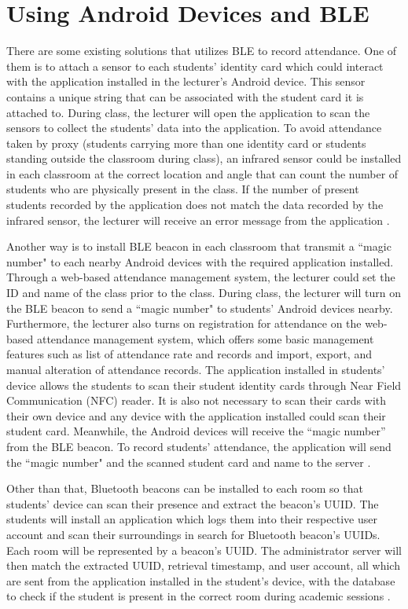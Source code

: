 \documentclass[../report.tex]{subfiles}
\begin{document}
\section{Using Android Devices and BLE}
There are some existing solutions that utilizes BLE to record attendance. One of them is to attach a sensor to each students’ identity card which could interact with the application installed in the lecturer’s Android device. This sensor contains a unique string that can be associated with the student card it is attached to. During class, the lecturer will open the application to scan the sensors to collect the students’ data into the application. To avoid attendance taken by proxy (students carrying more than one identity card or students standing outside the classroom during class), an infrared sensor could be installed in each classroom at the correct location and angle that can count the number of students who are physically present in the class. If the number of present students recorded by the application does not match the data recorded by the infrared sensor, the lecturer will receive an error message from the application \cite{7848166}.

Another way is to install BLE beacon in each classroom that transmit a ``magic number" to each nearby Android devices with the required application installed. Through a web-based attendance management system, the lecturer could set the ID and name of the class prior to the class. During class, the lecturer will turn on the BLE beacon to send a ``magic number" to students’ Android devices nearby. Furthermore, the lecturer also turns on registration for attendance on the web-based attendance management system, which offers some basic management features such as list of attendance rate and records and import, export, and manual alteration of attendance records. The application installed in students’ device allows the students to scan their student identity cards through Near Field Communication (NFC) reader. It is also not necessary to scan their cards with their own device and any device with the application installed could scan their student card. Meanwhile, the Android devices will receive the “magic number” from the BLE beacon. To record students’ attendance, the application will send the ``magic number" and the scanned student card and name to the server \cite{7350708}.

Other than that, Bluetooth beacons can be installed to each room so that students’ device can scan their presence and extract the beacon’s UUID. The students will install an application which logs them into their respective user account and scan their surroundings in search for Bluetooth beacon’s UUIDs. Each room will be represented by a beacon’s UUID. The administrator server will then match the extracted UUID, retrieval timestamp, and user account, all which are sent from the application installed in the student’s device, with the database to check if the student is present in the correct room during academic sessions \cite{20200029173}.
\end{document}
